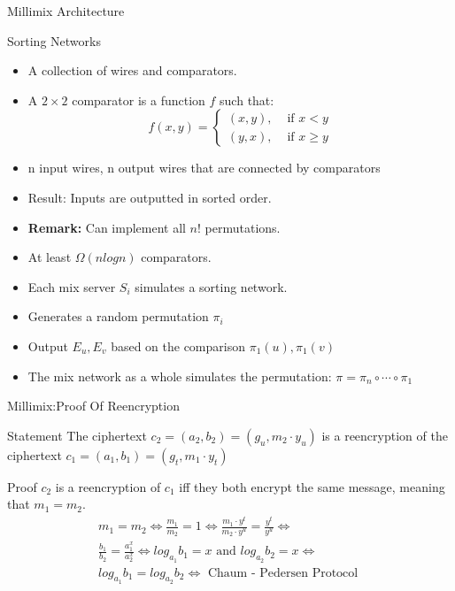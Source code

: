 \documentclass{beamer}
\begin{document}
\begin{frame}[allowframebreaks]{Millimix Architecture}
\begin{block}{Sorting Networks}
\begin{itemize}
\item A collection of wires and comparators. 
\item A $2\times2$ comparator is a function $f$ such that:
\[
f(x,y) = \begin{cases} (x,y), & \text{ if }  x<y  \\ (y,x), & \text{ if } x \geq y  \end{cases}
\]
\item n input wires, n output wires that are connected by comparators
\item Result: Inputs are outputted in sorted order.
\item \textbf{Remark:} Can implement all $n!$ permutations.
\item At least $\Omega(nlogn)$ comparators. 
\end{itemize}
\end{block}
\begin{itemize}
\framebreak
\item Each mix server $S_i$ simulates a sorting network.
\item Generates a random permutation $\pi_i$
\item Output $E_u,E_v$ based on the comparison $\pi_1(u), \pi_1(v)$
\item The mix network as a whole simulates the permutation: $\pi = \pi_n \circ \cdots \circ \pi_1$
\end{itemize}
\end{frame}

\begin{frame}{Millimix:Proof Of Reencryption}
\begin{block}{Statement}
The ciphertext $c_2 = (a_2,b_2) = (g_u,m_2 \cdot y_u)$ is a reencryption of the ciphertext $c_1 = (a_1,b_1) = (g_t,m_1 \cdot y_t)$
\end{block}
\begin{block}{Proof}
$c_2$ is a reencryption of $c_1$ iff they both encrypt the same message, meaning that $m_1=m_2$.
\begin{align*}
m_1 = m_2 \Leftrightarrow  \frac{m_1}{m_2} = 1 \Leftrightarrow  \frac{m_1 \cdot y^t}{m_2 \cdot y^u} = \frac{y^t}{y^u} \Leftrightarrow\\  \frac{b_1}{b_2} = \frac{a_{1}^{x}}{a_{2}^{x}} \Leftrightarrow log_{a_1}b_1 = x  \text{  and  } log_{a_2}b_2 = x \Leftrightarrow\\   log_{a_1}b_1 = log_{a_2}b_2 \Leftrightarrow  \text{ Chaum - Pedersen Protocol }
\end{align*}
\end{block}
\end{frame}
\end{document}
